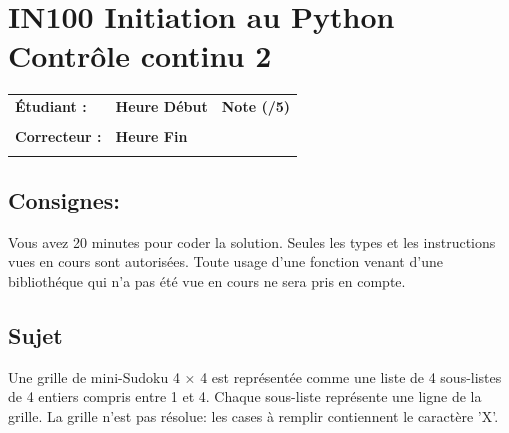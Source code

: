 \documentclass[a4paper,11pt]{article}
\begin{document}
\newtheorem{theo}{Theorem}
\newtheorem{coro}{Corollary}[theo]
\newtheorem{lemme}{Lemma}
\renewcommand{\thecoro}{\thetheo.\arabic{coro}}



\parindent=0cm


\section*{\center IN100 Initiation au Python\\
Contrôle continu 2}

\vspace{1 cm}

\begin{table}[h!]
\centering
\renewcommand{\arraystretch}{1.4} %
\begin{tabular}{|p{10cm}|p{3cm}|p{2cm}|}
\hline
\textbf{Étudiant :} & \textbf{Heure Début }  & \textbf{Note (/5) }  \\
& & \\
\hline
\textbf{Correcteur :} & \textbf{Heure Fin } & \\
& & \\
\hline

\hline
\end{tabular}
\end{table}


\subsection*{Consignes:} Vous avez 20 minutes pour coder la solution. Seules les types et les instructions vues en cours sont autorisées. Toute usage d'une fonction 
venant d'une bibliothéque qui n'a pas été vue en cours ne sera pris en compte. 


\subsection*{Sujet}

Une grille de mini-Sudoku 4 × 4 est représentée comme une liste de 4 sous-listes de 4
entiers compris entre 1 et 4. Chaque sous-liste représente une ligne de la grille. 
La grille n'est pas résolue: les cases à remplir contiennent le caractère 'X'. 
\end{document}
